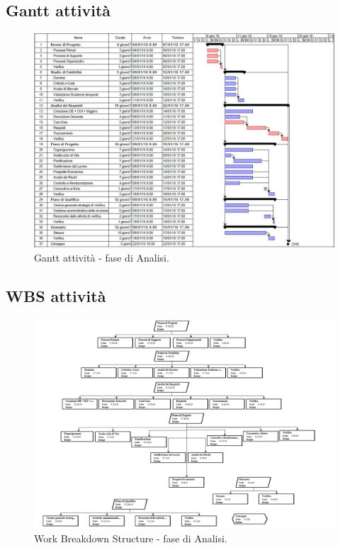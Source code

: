 \documentclass[a4paper]{report}
\begin{document}
			\subsection{Gantt attività}
				\begin{figure}[H]
					\centering
					\includegraphics[scale=0.4]{GanttAnalisi}
					\caption{Gantt attività - fase di Analisi.}
				\end{figure}
			\subsection{WBS attività}
				\begin{figure}[H]
					\centering
					\includegraphics[scale=0.5]{WBSAnalisi}
					\caption{Work Breakdown Structure - fase di Analisi.}
				\end{figure}
\end{document}
